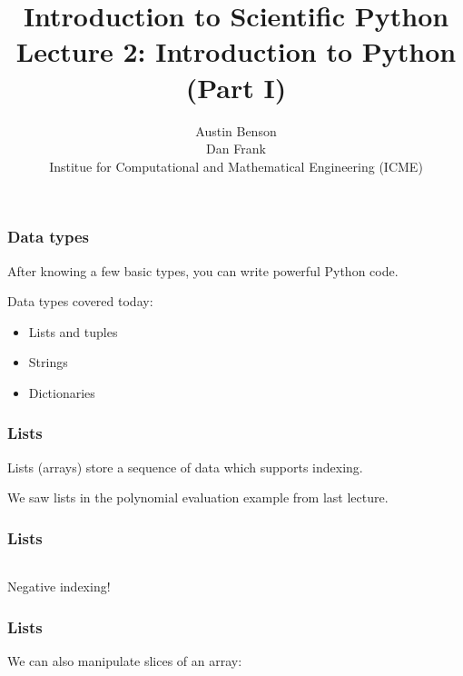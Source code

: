 \documentclass{beamer}
\title{Introduction to Scientific Python \\
Lecture 2: Introduction to Python (Part I)}
\author{Austin Benson \\
\vspace{0.1in}
Dan Frank \\
\vspace{0.1in}
Institue for Computational and Mathematical Engineering (ICME)}
\begin{document}
\maketitle

\begin{frame}
\frametitle{Data types}

After knowing a few basic types, you can write powerful Python code.

\vspace{0.1in}

Data types covered today:
\begin{itemize}
\setlength{\itemsep}{0.1in}
\item{Lists and tuples}
\item{Strings}
\item{Dictionaries}
\end{itemize}

\end{frame}

\begin{frame}
\frametitle{Lists}

Lists (arrays) store a sequence of data which supports indexing.

\vspace{0.1in}

We saw lists in the polynomial evaluation example from last lecture.

\end{frame}

\begin{frame}
\frametitle{Lists}

\begin{tabular}{l}

\end{tabular}

\vspace{0.1in}

Negative indexing!

\end{frame}

\begin{frame}
\frametitle{Lists}
We can also manipulate slices of an array:

\begin{center}
\begin{tabular}{c}

\end{tabular}
\end{center}

\end{frame}
\end{document}
